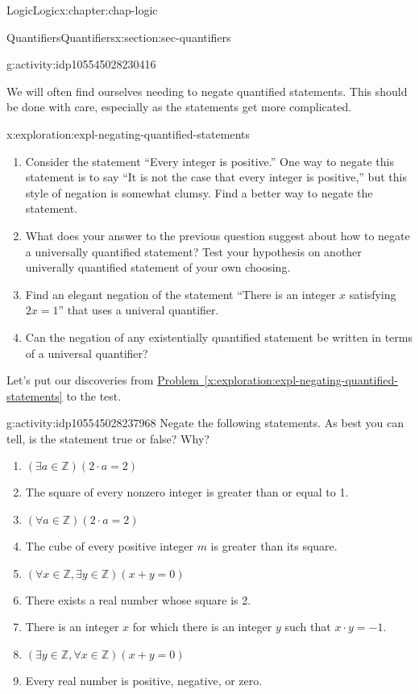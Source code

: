 \documentclass[oneside,10pt,]{book}
\newcommand{\xreffont}{\relax}
\def\Z{{\mathbb Z}}
\newcommand{\Z}{\mathbb Z}
\begin{document}
\begin{chapterptx}{Logic}{}{Logic}{}{}{x:chapter:chap-logic}
\begin{sectionptx}{Quantifiers}{}{Quantifiers}{}{}{x:section:sec-quantifiers}
\begin{activity}{}{g:activity:idp105545028230416}
\end{activity}%
We will often find ourselves needing to negate quantified statements. This should be done with care, especially as the statements get more complicated.%
\begin{exploration}{}{x:exploration:expl-negating-quantified-statements}%
%
\begin{enumerate}
\item{}Consider the statement ``Every integer is positive.'' One way to negate this statement is to say ``It is not the case that every integer is positive,'' but this style of negation is somewhat clumsy. Find a better way to negate the statement.%
\item{}What does your answer to the previous question suggest about how to negate a universally quantified statement? Test your hypothesis on another univerally quantified statement of your own choosing.%
\item{}Find an elegant negation of the statement ``There is an integer \(x\) satisfying \(2x = 1\)'' that uses a univeral quantifier.%
\item{}Can the negation of any existentially quantified statement be written in terms of a universal quantifier?%
\end{enumerate}
\end{exploration}%
Let's put our discoveries from \hyperref[x:exploration:expl-negating-quantified-statements]{Problem~{\xreffont\ref{x:exploration:expl-negating-quantified-statements}}} to the test.%
\begin{activity}{}{g:activity:idp105545028237968}%
Negate the following statements. As best you can tell, is the statement true or false? Why?%
%
\begin{enumerate}
\item{}\(\displaystyle (\exists a\in\Z ) (2\cdot a = 2)\)%
\item{}The square of every nonzero integer is greater than or equal to 1.%
\item{}\(\displaystyle (\forall a\in \Z) (2\cdot a = 2)\)%
\item{}The cube of every positive integer \(m\) is greater than its square.%
\item{}\(\displaystyle (\forall x\in \Z, \exists y\in\Z)(x+y=0)\)%
\item{}There exists a real number whose square is 2.%
\item{}There is an integer \(x\) for which there is an integer \(y\) such that \(x\cdot y = -1\).%
\item{}\(\displaystyle (\exists y\in \Z, \forall x\in \Z)(x+y=0)\)%
\item{}Every real number is positive, negative, or zero.%
\end{enumerate}
\end{activity}%
\end{sectionptx}
\end{chapterptx}
\end{document}
